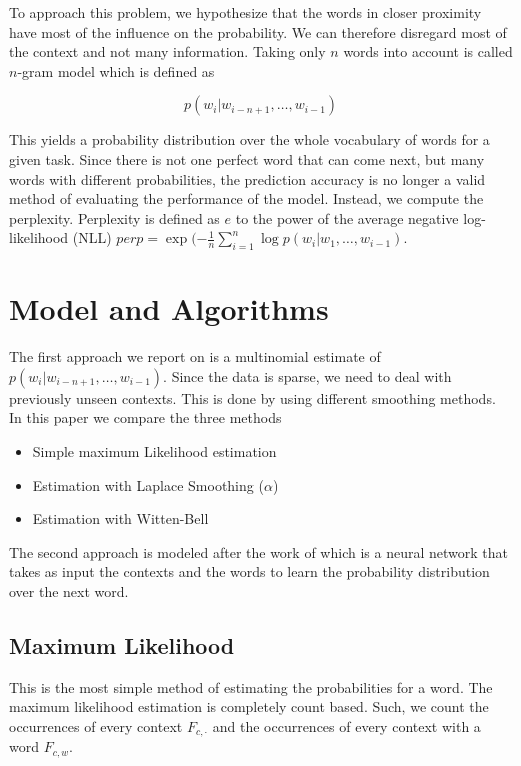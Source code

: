 \documentclass[11pt]{article}
\begin{document}
To approach this problem, we hypothesize that the words in closer proximity have most of the influence on the probability. We can therefore disregard most of the context and not many information. Taking only $n$ words into account is called $n$-gram model which is defined as 

$$p(w_i|w_{i-n+1}, \ldots, w_{i-1})$$

This yields a probability distribution over the whole vocabulary of words for a given task. Since there is not one perfect word that can come next, but many words with different probabilities, the prediction accuracy is no longer a valid method of evaluating the performance of the model. Instead, we compute the perplexity. Perplexity is defined as $e$ to the power of the average negative log-likelihood (NLL) $perp = \exp(-\frac{1}{n}\sum_{i=1}^{n}\log p(w_i|w_1,\ldots,w_{i-1})$. 



\section{Model and Algorithms}

The first approach we report on is a multinomial estimate of $p(w_i|w_{i-n+1}, \ldots, w_{i-1})$. Since the data is sparse, we need to deal with previously unseen contexts. This is done by using different smoothing methods. In this paper we compare the three methods 
\begin{itemize}
\item Simple maximum Likelihood estimation
\item Estimation with Laplace Smoothing ($\alpha$)
\item Estimation with Witten-Bell
\end{itemize}

The second approach is modeled after the work of \citet{Bengio2003neural} which is a neural network that takes as input the contexts and the words to learn the probability distribution over the next word. 

\subsection{Maximum Likelihood}

This is the most simple method of estimating the probabilities for a word. The maximum likelihood estimation is completely count based. Such, we count the occurrences of every context $F_{c,\cdot}$ and the occurrences of every context with a word $F_{c,w}$. 
\end{document}
